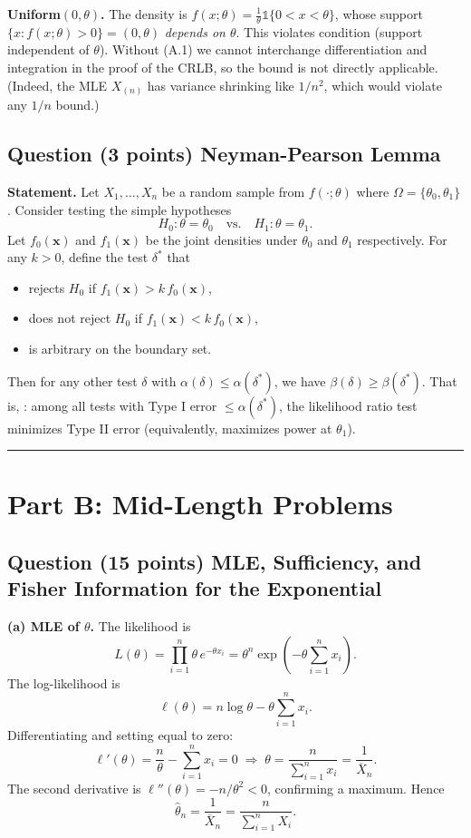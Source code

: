 \documentclass[11pt]{article}
\newcounter{qnum}
\newcommand{\question}[2]{\stepcounter{qnum}\subsection*{Question \theqnum \quad (#1 points) \hfill #2}}
\begin{document}
\textbf{Uniform$(0,\theta)$.} The density is $f(x;\theta) = \tfrac{1}{\theta}\mathbb{1}\{0 < x < \theta\}$, whose support $\{x: f(x;\theta) > 0\} = (0,\theta)$ \emph{depends on $\theta$}. This violates condition  (support independent of $\theta$). Without (A.1) we cannot interchange differentiation and integration in the proof of the CRLB, so the bound is not directly applicable. (Indeed, the MLE $X_{(n)}$ has variance shrinking like $1/n^2$, which would violate any $1/n$ bound.)

\question{3}{Neyman-Pearson Lemma}

\textbf{Statement.} Let $X_1,\ldots,X_n$ be a random sample from $f(\cdot;\theta)$ where $\Omega = \{\theta_0,\theta_1\}$. Consider testing the simple hypotheses
\[ H_0: \theta = \theta_0 \quad \text{vs.} \quad H_1: \theta = \theta_1. \]
Let $f_0(\mathbf{x})$ and $f_1(\mathbf{x})$ be the joint densities under $\theta_0$ and $\theta_1$ respectively. For any $k > 0$, define the test $\delta^*$ that
\begin{itemize}[leftmargin=2em,nosep]
    \item rejects $H_0$ if $f_1(\mathbf{x}) > k\, f_0(\mathbf{x})$,
    \item does not reject $H_0$ if $f_1(\mathbf{x}) < k\, f_0(\mathbf{x})$,
    \item is arbitrary on the boundary set.
\end{itemize}
Then for any other test $\delta$ with $\alpha(\delta) \le \alpha(\delta^*)$, we have $\beta(\delta) \ge \beta(\delta^*)$. That is, : among all tests with Type I error $\le \alpha(\delta^*)$, the likelihood ratio test minimizes Type II error (equivalently, maximizes power at $\theta_1$).

\bigskip
\hrule
\bigskip

\section*{Part B: Mid-Length Problems}

\question{15}{MLE, Sufficiency, and Fisher Information for the Exponential}

\textbf{(a) MLE of $\theta$.} The likelihood is
\[ L(\theta) = \prod_{i=1}^n \theta\, e^{-\theta x_i} = \theta^n \exp\!\left(-\theta\sum_{i=1}^n x_i\right). \]
The log-likelihood is
\[ \ell(\theta) = n\log\theta - \theta\sum_{i=1}^n x_i. \]
Differentiating and setting equal to zero:
\[ \ell'(\theta) = \frac{n}{\theta} - \sum_{i=1}^n x_i = 0 \;\Longrightarrow\; \theta = \frac{n}{\sum_{i=1}^n x_i} = \frac{1}{\overline{X}_n}. \]
The second derivative is $\ell''(\theta) = -n/\theta^2 < 0$, confirming a maximum. Hence
\[ \boxed{\hat\theta_n = \dfrac{1}{\overline{X}_n} = \dfrac{n}{\sum_{i=1}^n X_i}}. \]
\end{document}
